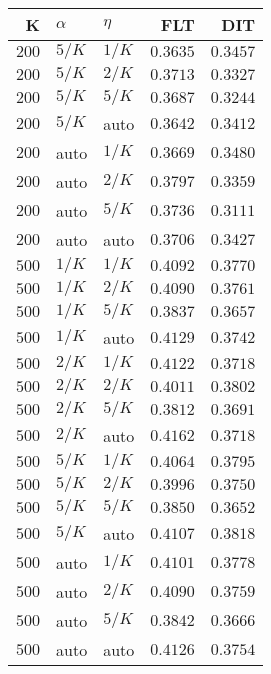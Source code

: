 \begin{table}
\begin{spacing}{1.2}
{\begin{tabular}{rll|rr}
\bottomrule
\end{tabular}
} \hfill \parbox{.45\linewidth}{\centering \begin{tabular}{rll|rr}
\toprule
    K &  $\alpha$ &    $\eta$ &           FLT &           DIT \\
\midrule
$200$ &  $5/K$ &  $1/K$ &      $0.3635$ &      $0.3457$ \\
$200$ &  $5/K$ &  $2/K$ &      $0.3713$ &      $0.3327$ \\
$200$ &  $5/K$ &  $5/K$ &      $0.3687$ &      $0.3244$ \\
$200$ &  $5/K$ &   auto &      $0.3642$ &      $0.3412$ \\
$200$ &   auto &  $1/K$ &      $0.3669$ &      $0.3480$ \\
$200$ &   auto &  $2/K$ &      $0.3797$ &      $0.3359$ \\
$200$ &   auto &  $5/K$ &      $0.3736$ &      $0.3111$ \\
$200$ &   auto &   auto &      $0.3706$ &      $0.3427$ \\
\myrowcolor $500$ &  $1/K$ &  $1/K$ &      $0.4092$ &      $0.3770$ \\
$500$ &  $1/K$ &  $2/K$ &      $0.4090$ &      $0.3761$ \\
$500$ &  $1/K$ &  $5/K$ &      $0.3837$ &      $0.3657$ \\
$500$ &  $1/K$ &   auto &      $0.4129$ &      $0.3742$ \\
$500$ &  $2/K$ &  $1/K$ &      $0.4122$ &      $0.3718$ \\
$500$ &  $2/K$ &  $2/K$ &      $0.4011$ &      $0.3802$ \\
$500$ &  $2/K$ &  $5/K$ &      $0.3812$ &      $0.3691$ \\
$500$ &  $2/K$ &   auto & $\bm{0.4162}$ &      $0.3718$ \\
$500$ &  $5/K$ &  $1/K$ &      $0.4064$ &      $0.3795$ \\
$500$ &  $5/K$ &  $2/K$ &      $0.3996$ &      $0.3750$ \\
$500$ &  $5/K$ &  $5/K$ &      $0.3850$ &      $0.3652$ \\
$500$ &  $5/K$ &   auto &      $0.4107$ & $\bm{0.3818}$ \\
$500$ &   auto &  $1/K$ &      $0.4101$ &      $0.3778$ \\
$500$ &   auto &  $2/K$ &      $0.4090$ &      $0.3759$ \\
$500$ &   auto &  $5/K$ &      $0.3842$ &      $0.3666$ \\
$500$ &   auto &   auto &      $0.4126$ &      $0.3754$ \\
\bottomrule
\end{tabular}
}
\end{spacing}
\end{table}
